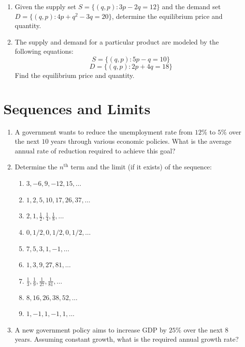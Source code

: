 \documentclass{article}
\begin{document}
\begin{enumerate}[leftmargin = 0.5cm, label = \arabic*., rightmargin = 0.2cm]

    \item Given the supply set $S = \{(q,p) : 3p - 2q = 12\}$ and the demand set $D = \{(q,p) : 4p + q^2 - 3q = 20\}$, determine the equilibrium price and quantity.

    \item The supply and demand for a particular product are modeled by the following equations: 
    \[
    S = \{(q,p) : 5p - q = 10\}
    \]
    \[
    D = \{(q,p) : 2p + 4q = 18\}
    \]
    Find the equilibrium price and quantity.

\end{enumerate}

\section{Sequences and Limits}

\begin{enumerate}[leftmargin = 0.5cm, label = \arabic*., rightmargin = 0.2cm]

    \item A government wants to reduce the unemployment rate from $12\%$ to $5\%$ over the next $10$ years through various economic policies. What is the average annual rate of reduction required to achieve this goal?

    \item Determine the $n^{\text{th}}$ term and the limit (if it exists) of the sequence:

    \begin{enumerate}[leftmargin = 0.5cm, label = (\alph*), rightmargin = 0.2cm]
        \item $3, -6, 9, -12, 15, \dots$
        \item $1, 2, 5, 10, 17, 26, 37, \dots$
        \item $2, 1, \frac{1}{2}, \frac{1}{4}, \frac{1}{8}, \dots$
        \item $0, 1/2, 0, 1/2, 0, 1/2, \dots$
        \item $7, 5, 3, 1, -1, \dots$
        \item $1, 3, 9, 27, 81, \dots$
        \item $\frac{1}{3}, \frac{1}{9}, \frac{1}{27}, \frac{1}{81}, \dots$
        \item $8, 16, 26, 38, 52, \dots$
        \item $1, -1, 1, -1, 1, \dots$
    \end{enumerate}

    \item A new government policy aims to increase GDP by $25\%$ over the next $8$ years. Assuming constant growth, what is the required annual growth rate?

\end{enumerate}
\end{document}
